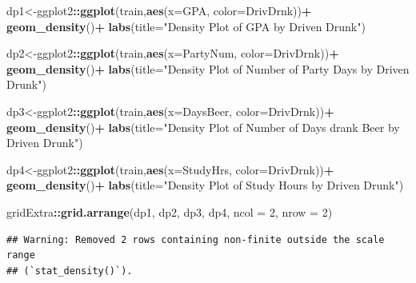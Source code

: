 \documentclass[
]{book}
\newenvironment{Shaded}{\begin{snugshade}}{\end{snugshade}}
\newcommand{\AttributeTok}[1]{\textcolor[rgb]{0.13,0.29,0.53}{#1}}
\newcommand{\DecValTok}[1]{\textcolor[rgb]{0.00,0.00,0.81}{#1}}
\newcommand{\FunctionTok}[1]{\textcolor[rgb]{0.13,0.29,0.53}{\textbf{#1}}}
\newcommand{\NormalTok}[1]{#1}
\newcommand{\OtherTok}[1]{\textcolor[rgb]{0.56,0.35,0.01}{#1}}
\newcommand{\SpecialCharTok}[1]{\textcolor[rgb]{0.81,0.36,0.00}{\textbf{#1}}}
\newcommand{\StringTok}[1]{\textcolor[rgb]{0.31,0.60,0.02}{#1}}
\begin{document}
\begin{Shaded}
\begin{Highlighting}[]
\NormalTok{dp1}\OtherTok{\textless{}{-}}\NormalTok{ggplot2}\SpecialCharTok{::}\FunctionTok{ggplot}\NormalTok{(train,}\FunctionTok{aes}\NormalTok{(}\AttributeTok{x=}\NormalTok{GPA, }\AttributeTok{color=}\NormalTok{DrivDrnk))}\SpecialCharTok{+}
  \FunctionTok{geom\_density}\NormalTok{()}\SpecialCharTok{+}
  \FunctionTok{labs}\NormalTok{(}\AttributeTok{title=}\StringTok{"Density Plot of GPA by Driven Drunk"}\NormalTok{)}

\NormalTok{dp2}\OtherTok{\textless{}{-}}\NormalTok{ggplot2}\SpecialCharTok{::}\FunctionTok{ggplot}\NormalTok{(train,}\FunctionTok{aes}\NormalTok{(}\AttributeTok{x=}\NormalTok{PartyNum, }\AttributeTok{color=}\NormalTok{DrivDrnk))}\SpecialCharTok{+}
  \FunctionTok{geom\_density}\NormalTok{()}\SpecialCharTok{+}
  \FunctionTok{labs}\NormalTok{(}\AttributeTok{title=}\StringTok{"Density Plot of Number of Party Days by Driven Drunk"}\NormalTok{)}

\NormalTok{dp3}\OtherTok{\textless{}{-}}\NormalTok{ggplot2}\SpecialCharTok{::}\FunctionTok{ggplot}\NormalTok{(train,}\FunctionTok{aes}\NormalTok{(}\AttributeTok{x=}\NormalTok{DaysBeer, }\AttributeTok{color=}\NormalTok{DrivDrnk))}\SpecialCharTok{+}
  \FunctionTok{geom\_density}\NormalTok{()}\SpecialCharTok{+}
  \FunctionTok{labs}\NormalTok{(}\AttributeTok{title=}\StringTok{"Density Plot of Number of Days drank Beer by Driven Drunk"}\NormalTok{)}

\NormalTok{dp4}\OtherTok{\textless{}{-}}\NormalTok{ggplot2}\SpecialCharTok{::}\FunctionTok{ggplot}\NormalTok{(train,}\FunctionTok{aes}\NormalTok{(}\AttributeTok{x=}\NormalTok{StudyHrs, }\AttributeTok{color=}\NormalTok{DrivDrnk))}\SpecialCharTok{+}
  \FunctionTok{geom\_density}\NormalTok{()}\SpecialCharTok{+}
  \FunctionTok{labs}\NormalTok{(}\AttributeTok{title=}\StringTok{"Density Plot of Study Hours by Driven Drunk"}\NormalTok{)}

\NormalTok{gridExtra}\SpecialCharTok{::}\FunctionTok{grid.arrange}\NormalTok{(dp1, dp2, dp3, dp4, }\AttributeTok{ncol =} \DecValTok{2}\NormalTok{, }\AttributeTok{nrow =} \DecValTok{2}\NormalTok{)}
\end{Highlighting}
\end{Shaded}

\begin{verbatim}
## Warning: Removed 2 rows containing non-finite outside the scale range
## (`stat_density()`).
\end{verbatim}
\end{document}
